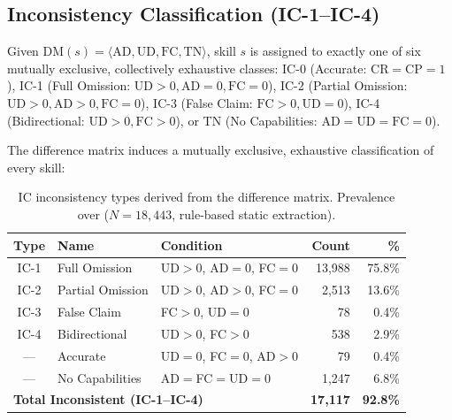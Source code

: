 \subsection{Inconsistency Classification (IC-1--IC-4)}
\label{sec:ic_classification}

\begin{definition}[IC Classification]
\label{def:ic}
Given $\text{DM}(s) = \langle\text{AD},\text{UD},\text{FC},\text{TN}\rangle$,
skill $s$ is assigned to exactly one of six mutually exclusive, collectively
exhaustive classes: IC-0 (Accurate: $\text{CR}=\text{CP}=1$),
IC-1 (Full Omission: $\text{UD}>0, \text{AD}=0, \text{FC}=0$),
IC-2 (Partial Omission: $\text{UD}>0, \text{AD}>0, \text{FC}=0$),
IC-3 (False Claim: $\text{FC}>0, \text{UD}=0$),
IC-4 (Bidirectional: $\text{UD}>0, \text{FC}>0$),
or TN (No Capabilities: $\text{AD}=\text{UD}=\text{FC}=0$).
\end{definition}

The difference matrix induces a mutually exclusive, exhaustive
classification of every skill:

\begin{table}[h]
\centering
\caption{IC inconsistency types derived from the difference matrix.
  Prevalence over \clawhub{} ($N{=}18{,}443$, rule-based static extraction).}
\label{tab:ic_types}
\scriptsize
\begin{tabular}{@{}clp{3.2cm}rr@{}}
\toprule
\textbf{Type} & \textbf{Name} & \textbf{Condition} & \textbf{Count} & \textbf{\%} \\
\midrule
IC-1 & Full Omission      & UD$>$0, AD$=$0, FC$=$0 & 13{,}988 & 75.8\% \\
IC-2 & Partial Omission   & UD$>$0, AD$>$0, FC$=$0 & 2{,}513  & 13.6\% \\
IC-3 & False Claim        & FC$>$0, UD$=$0         & 78       &  0.4\% \\
IC-4 & Bidirectional      & UD$>$0, FC$>$0         & 538      &  2.9\% \\
\midrule
---    & Accurate           & UD$=$0, FC$=$0, AD$>$0 & 79       &  0.4\% \\
---    & No Capabilities    & AD$=$FC$=$UD$=$0       & 1{,}247  &  6.8\% \\
\midrule
\multicolumn{3}{l}{\textbf{Total Inconsistent (IC-1--IC-4)}} & \textbf{17{,}117} & \textbf{92.8\%} \\
\bottomrule
\end{tabular}
\end{table}

